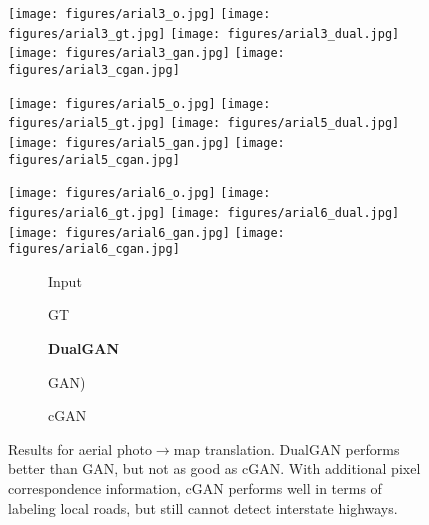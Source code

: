 \begin{figure}
\begin{center}


\texttt{[image: figures/arial3\_o.jpg]}
\texttt{[image: figures/arial3\_gt.jpg]}
\texttt{[image: figures/arial3\_dual.jpg]}
\texttt{[image: figures/arial3\_gan.jpg]}
\texttt{[image: figures/arial3\_cgan.jpg]}



\texttt{[image: figures/arial5\_o.jpg]}
\texttt{[image: figures/arial5\_gt.jpg]}
\texttt{[image: figures/arial5\_dual.jpg]}
\texttt{[image: figures/arial5\_gan.jpg]}
\texttt{[image: figures/arial5\_cgan.jpg]}

\texttt{[image: figures/arial6\_o.jpg]}
\texttt{[image: figures/arial6\_gt.jpg]}
\texttt{[image: figures/arial6\_dual.jpg]}
\texttt{[image: figures/arial6\_gan.jpg]}
\texttt{[image: figures/arial6\_cgan.jpg]}

\begin{subfigure}[]{0.19\linewidth}\caption*{Input}\end{subfigure}
\begin{subfigure}[]{0.19\linewidth}\caption*{GT}\end{subfigure}
\begin{subfigure}[]{0.19\linewidth}\caption*{\textbf{DualGAN}}\end{subfigure}
\begin{subfigure}[]{0.19\linewidth}\caption*{GAN)}\end{subfigure}
\begin{subfigure}[]{0.19\linewidth}\caption*{cGAN~\cite{isola2016image}}\end{subfigure}
\caption{Results for aerial photo$\rightarrow$map translation. DualGAN performs better than 
GAN, but not as good as cGAN. With additional pixel correspondence information, cGAN performs 
well in terms of labeling local roads, but still cannot detect interstate highways.}
\label{fig:aerial}
\end{center}
\end{figure}


